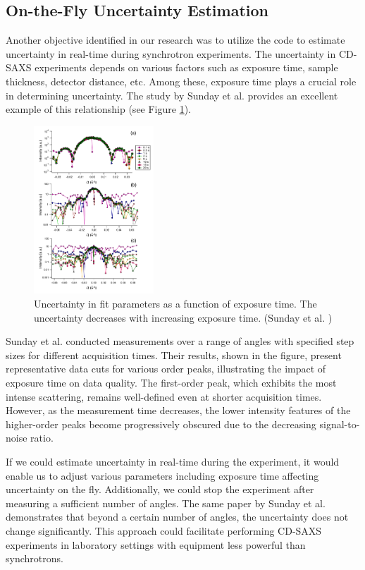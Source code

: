 \subsection{On-the-Fly Uncertainty Estimation}

Another objective identified in our research was to utilize the code to estimate 
uncertainty in real-time during synchrotron experiments. The uncertainty in CD-SAXS experiments 
depends on various factors such as exposure time, sample thickness, detector distance, etc. Among 
these, exposure time plays a crucial role in determining uncertainty. The study by Sunday et al. \cite{sunday2016evaluation} 
provides an excellent example of this relationship (see Figure \ref{fig:exposure}).

\begin{figure}[h]
\centering
\includegraphics[width=0.4\textwidth]{images/exposure.png}
\caption{Uncertainty in fit parameters as a function of exposure time. The uncertainty decreases with increasing exposure time. (Sunday et al. \cite{sunday2016evaluation})}
\label{fig:exposure}
\end{figure}

Sunday et al. conducted measurements over a range of angles with specified step sizes for different 
acquisition times. Their results, shown in the figure, present representative data cuts for various 
order peaks, illustrating the impact of exposure time on data quality. The first-order peak, which 
exhibits the most intense scattering, remains well-defined even at shorter acquisition times. However, 
as the measurement time decreases, the lower intensity features of the higher-order peaks become 
progressively obscured due to the decreasing signal-to-noise ratio.

If we could estimate uncertainty in real-time during the experiment, it would enable us to adjust 
various parameters including exposure time affecting uncertainty on the fly. Additionally, we could stop the experiment 
after measuring a sufficient number of angles. The same paper by Sunday et al. demonstrates that 
beyond a certain number of angles, the uncertainty does not change significantly. This approach 
could facilitate performing CD-SAXS experiments in laboratory settings with equipment less powerful 
than synchrotrons.

